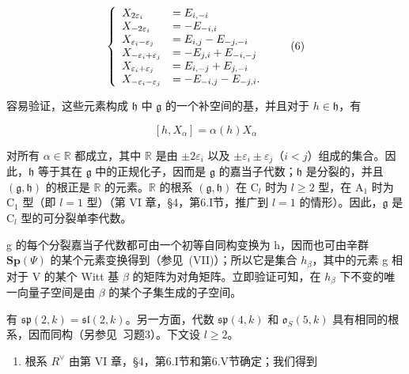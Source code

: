 \[
\left\{ \begin{array}{l l} X _ {2 \varepsilon_ {i}} & = E _ {i, - i} \\ X _ {- 2 \varepsilon_ {i}} & = - E _ {- i, i} \\ X _ {\varepsilon_ {i} - \varepsilon_ {j}} & = E _ {i, j} - E _ {- j, - i} \\ X _ {- \varepsilon_ {i} + \varepsilon_ {j}} & = - E _ {j, i} + E _ {- i, - j} \\ X _ {\varepsilon_ {i} + \varepsilon_ {j}} & = E _ {i, - j} + E _ {j, - i} \\ X _ {- \varepsilon_ {i} - \varepsilon_ {j}} & = - E _ {- i, j} - E _ {- j, i}. \end{array} \right.\tag{6}
\]

容易验证，这些元素构成 \(\mathfrak{h}\) 中 \(\mathfrak{g}\) 的一个补空间的基，并且对于 \(h\in \mathfrak{h}\)，有

\[
[ h, X _ {\alpha} ] = \alpha (h) X _ {\alpha}\tag{7}
\]

对所有 \(\alpha \in \mathbb{R}\) 都成立，其中 \(\mathbb{R}\) 是由 \(\pm 2\varepsilon_{i}\) 以及 \(\pm \varepsilon_{i} \pm \varepsilon_{j}\)（\(i < j\)）组成的集合。因此，\(\mathfrak{h}\) 等于其在 \(\mathfrak{g}\) 中的正规化子，因而是 \(\mathfrak{g}\) 的嘉当子代数；\(\mathfrak{h}\) 是分裂的，并且 \((\mathfrak{g}, \mathfrak{h})\) 的根正是 \(\mathbb{R}\) 的元素。\(\mathbb{R}\) 的根系 \((\mathfrak{g}, \mathfrak{h})\) 在 \(\mathrm{C}_{l}\) 时为 \(l \geq 2\) 型，在 \(\mathrm{A}_{1}\) 时为 \(\mathrm{C}_{1}\) 型（即 \(l = 1\) 型）（第 VI 章，§4，第6.I节，推广到 \(l = 1\) 的情形）。因此，\(\mathfrak{g}\) 是 \(\mathrm{C}_{l}\) 型的可分裂单李代数。

g 的每个分裂嘉当子代数都可由一个初等自同构变换为 h，因而也可由辛群 \(\mathbf{Sp}(\varPsi)\) 的某个元素变换得到（参见~(VII)）；所以它是集合 \(h_{\beta}\)，其中的元素 g 相对于 V 的某个 Witt 基 \(\beta\) 的矩阵为对角矩阵。立即验证可知，在 \(h_{\beta}\) 下不变的唯一向量子空间是由 \(\beta\) 的某个子集生成的子空间。

有 \(\mathfrak{sp}(2,k) = \mathfrak{sl}(2,k)\)。另一方面，代数 \(\mathfrak{sp}(4,k)\) 和 \(\mathfrak{o}_S(5,k)\) 具有相同的根系，因而同构（另参见~习题3）。下文设 \(l \geq 2\)。

\begin{enumerate}
\def\labelenumi{(\Roman{enumi})}
\setcounter{enumi}{1}
\tightlist
\item
根系 \(R^{\vee}\) 由第 VI 章，§4，第6.I节和第6.V节确定；我们得到
\end{enumerate}

